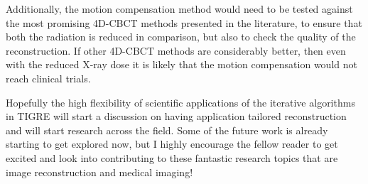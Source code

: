 Additionally, the motion compensation method would need to be tested against the most promising  4D-CBCT methods presented in the literature, to ensure that both the radiation is reduced in comparison, but also to check the quality of the reconstruction. If other 4D-CBCT methods are considerably better, then even with the reduced X-ray dose it is likely that the motion compensation would not reach clinical trials.

Hopefully the high flexibility of scientific applications of the iterative algorithms in TIGRE will start a discussion on having application tailored reconstruction and will start research across the field. Some of the future work is already starting to get explored now, but I highly encourage the fellow reader to get excited and look into contributing to these fantastic research topics that are image reconstruction and medical imaging!

